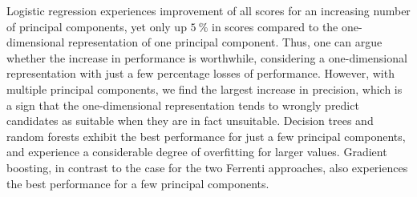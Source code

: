 \documentclass[superscriptaddress,unsortedaddress,
 amsmath,amssymb,
 aps,
]{revtex4-2}
\begin{document}
Logistic regression experiences improvement of all scores for an increasing number of principal components, yet only up $5 \ \%$ in scores compared to the one-dimensional representation of one principal component. Thus, one can argue whether the increase in performance is worthwhile, considering a one-dimensional representation with just a few percentage losses of performance. However, with multiple principal components, we find the largest increase in precision, which is a sign that the one-dimensional representation tends to wrongly predict candidates as suitable when they are in fact unsuitable. Decision trees and random forests exhibit the best performance for just a few principal components, and experience a considerable degree of overfitting for larger values. Gradient boosting, in contrast to the case for the two Ferrenti approaches, also experiences the best performance for a few principal components.

\begin{table}[t]
\centering
\caption{ Optimal number of principal components and the respective scores (standard deviation) for each of the four ML methods logistic regression (LOG), decision trees (DT), random forests (RF) and gradient boosting (GB) in the empirical approach, as visualized by the dash-dotted line in Fig.~\ref{fig:03-pca}.}
\label{tab:03-pca}
\noindent{}
\end{table}
\end{document}
